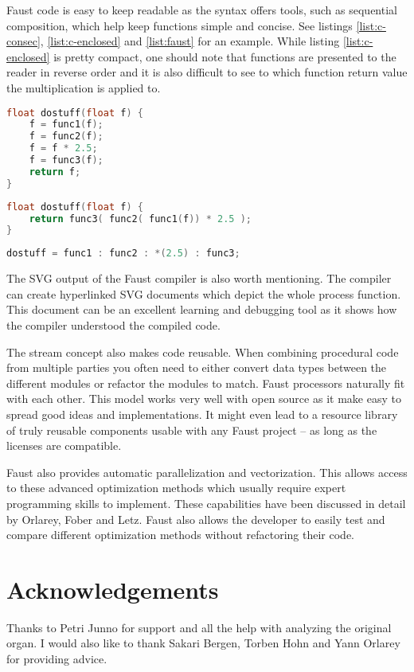 \documentclass[11pt,a4paper]{article}
\begin{document}
Faust code is easy to keep readable as the syntax offers tools, such as sequential composition, which help keep functions simple and concise. See listings \ref{list:c-consec}, \ref{list:c-enclosed} and \ref{list:faust} for an example. While listing \ref{list:c-enclosed} is pretty compact, one should note that functions are presented to the reader in reverse order and it is also difficult to see to which function return value the multiplication is applied to.

\begin{lstlisting}[language=C,label=list:c-consec,caption=Consecutive calls]
float dostuff(float f) {
	f = func1(f);
	f = func2(f);
	f = f * 2.5;
	f = func3(f);
	return f;
}
\end{lstlisting}

\begin{lstlisting}[language=C,label=list:c-enclosed,caption=Enclosed statements]
float dostuff(float f) {
	return func3( func2( func1(f)) * 2.5 );
}
\end{lstlisting}

\begin{lstlisting}[language=C,label=list:faust,caption=Faust sequential composition]
dostuff = func1 : func2 : *(2.5) : func3;
\end{lstlisting}

The SVG output of the Faust compiler is also worth mentioning. The compiler can create hyperlinked SVG documents which depict the whole process function. This document can be an excellent learning and debugging tool as it shows how the compiler understood the compiled code.

The stream concept also makes code reusable. When combining procedural code from multiple parties you often need to either convert data types between the different modules or refactor the modules to match. Faust processors naturally fit with each other. This model works very well with open source as it make easy to spread good ideas and implementations. It might even lead to a resource library of truly reusable components usable with any Faust project -- as long as the licenses are compatible.

Faust also provides automatic parallelization and vectorization. This allows access to these advanced optimization methods which usually require expert programming skills to implement. These capabilities have been discussed in detail by Orlarey, Fober and Letz\cite{orlarey:09a}. Faust also allows the developer to easily test and compare different optimization methods without refactoring their code.
\section{Acknowledgements}

Thanks to Petri Junno for support and all the help with analyzing the original organ. I would also like to thank Sakari Bergen, Torben Hohn and Yann Orlarey for providing advice.



\end{document}

